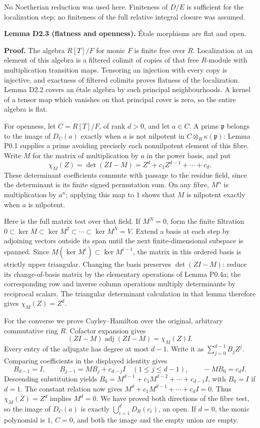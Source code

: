 \documentclass[11pt,a4paper,openany]{report}
\begin{document}
No Noetherian reduction was used here. Finiteness of \(D/E\) is sufficient for the localization step; no finiteness of the full relative integral closure was assumed.

\textbf{Lemma D2.3 (flatness and openness).} Étale morphisms are flat and open.

\textbf{Proof.} The algebra \(R[T]/F\) for monic \(F\) is finite free over \(R\). Localization at an element of this algebra is a filtered colimit of copies of that free \(R\)-module with multiplication transition maps. Tensoring an injection with every copy is injective, and exactness of filtered colimits proves flatness of the localization. Lemma D2.2 covers an étale algebra by such principal neighbourhoods. A kernel of a tensor map which vanishes on that principal cover is zero, so the entire algebra is flat.

For openness, let \(C=R[T]/F\), of rank \(d>0\), and let \(a\in C\). A prime \(\mathfrak p\) belongs to the image of \(D_C(a)\) exactly when \(a\) is not nilpotent in \(C\otimes_R\kappa(\mathfrak p)\): Lemma P0.1 supplies a prime avoiding precisely each nonnilpotent element of this fibre. Write \(M\) for the matrix of multiplication by \(a\) in the power basis, and put \[
\chi_M(Z)=\det(ZI-M)=Z^d+c_1Z^{d-1}+\cdots+c_d.
\] These determinant coefficients commute with passage to the residue field, since the determinant is its finite signed permutation sum. On any fibre, \(M^n\) is multiplication by \(a^n\); applying this map to \(1\) shows that \(M\) is nilpotent exactly when \(a\) is nilpotent.

Here is the full matrix test over that field. If \(M^N=0\), form the finite filtration \(0\subset\ker M\subset\ker M^2\subset\cdots\subset\ker M^N=V\). Extend a basis at each step by adjoining vectors outside its span until the next finite-dimensional subspace is spanned. Since \(M(\ker M^i)\subset\ker M^{i-1}\), the matrix in this ordered basis is strictly upper triangular. Changing the basis preserves \(\det(ZI-M)\): reduce its change-of-basis matrix by the elementary operations of Lemma P0.4a; the corresponding row and inverse column operations multiply determinants by reciprocal scalars. The triangular determinant calculation in that lemma therefore gives \(\chi_M(Z)=Z^d\).

For the converse we prove Cayley--Hamilton over the original, arbitrary commutative ring \(R\). Cofactor expansion gives \[
(ZI-M)\operatorname{adj}(ZI-M)=\chi_M(Z)I.
\] Every entry of the adjugate has degree at most \(d-1\). Write it as \(\sum_{j=0}^{d-1}B_jZ^j\). Comparing coefficients in the displayed identity gives \[
B_{d-1}=I,\qquad B_{j-1}=MB_j+c_{d-j}I\quad(1\le j\le d-1),\qquad -MB_0=c_dI.
\] Descending substitution yields \(B_0=M^{d-1}+c_1M^{d-2}+\cdots+c_{d-1}I\), with \(B_0=I\) if \(d=1\). The constant relation now gives \(M^d+c_1M^{d-1}+\cdots+c_dI=0\). Thus \(\chi_M(Z)=Z^d\) implies \(M^d=0\). We have proved both directions of the fibre test, so the image of \(D_C(a)\) is exactly \(\bigcup_{i=1}^dD_R(c_i)\), an open. If \(d=0\), the monic polynomial is \(1\), \(C=0\), and both the image and the empty union are empty.
\end{document}

